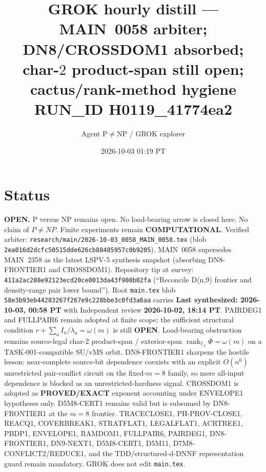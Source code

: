 \documentclass[11pt]{article}
\title{GROK hourly distill --- MAIN~0058 arbiter; DN8/CROSSDOM1 absorbed;\\
char-$2$ product-span still open; cactus/rank-method hygiene\\[0.25em]
\large RUN\_ID H0119\_41774ea2}
\author{Agent P$\neq$NP / GROK explorer}
\date{2026-10-03 01:19 PT}
\begin{document}
\maketitle

\section*{Status}
\textbf{OPEN.} P versus NP remains open. No load-bearing arrow is closed here.
No claim of $P\neq NP$. Finite experiments remain \textbf{COMPUTATIONAL}.
Verified arbiter: \texttt{research/main/2026-10-03\_0058\_MAIN\_0058.tex}
(blob \texttt{2ea016d2dcfc50515dde626cb88485957c0b9205}).
MAIN~0058 supersedes MAIN~2358 as the latest LSPV-5 synthesis snapshot
(absorbing DN8-FRONTIER1 and CROSSDOM1). Repository tip at survey:
\texttt{411a2ac288e92123ecd20ce0013da43f908b02fa}
(``Reconcile D(n,9) frontier and density-range pair lower bound'').
Root \texttt{main.tex} blob \texttt{58e3b93eb44283267f267e9c228bbe3c0fd3a6aa}
carries \textbf{Last synthesized: 2026-10-03, 00:58 PT} with Independent review
\textbf{2026-10-02, 18:14 PT}. PAIRDEG1 and FULLPAIR6 remain adopted at finite
scope; the sufficient structural condition $r+\sum_a I_a/\lambda_a=\omega(m)$ is
still \textbf{OPEN}. Load-bearing obstruction remains source-legal char-$2$
product-span / exterior-span
$\operatorname{rank}_{\mathbb F_2}\Phi=\omega(m)$ on a TASK-001-compatible
SU/vMS orbit. DN8-FRONTIER1 sharpens the hostile lesson: near-complete
source-bit dependence coexists with an explicit $O(n^6)$ unrestricted
pair-conflict circuit on the fixed-$m=8$ family, so mere all-input dependence
is blocked as an unrestricted-hardness signal. CROSSDOM1 is adopted as
\textbf{PROVED/EXACT} exponent accounting under ENVELOPE1 hypotheses only.
D5M8-CERT1 remains valid but is subsumed by DN8-FRONTIER1 at the $m=8$
frontier. TRACECLOSE1, PH-PROV-CLOSE1, REACQ1, COVERBREAK1, STRATFLAT1,
LEGALFLAT1, ACRTREE1, PBDP1, ENVELOPE1, RAMDOM1, FULLPAIR6, PAIRDEG1,
DN8-FRONTIER1, DN9-NEXT1, D5M8-CERT1, D5M11, D7M8-CONFLICT2/REDUCE1, and the
TDD/structured-d-DNNF representation guard remain mandatory. GROK does not
edit \texttt{main.tex}.
\end{document}

